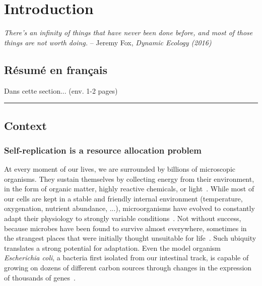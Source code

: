 \chapter{Introduction}

\textit{There's an infinity of things that have never been done before, and most of those things are not worth doing.} -- Jeremy Fox, \textit{Dynamic Ecology (2016)}~\cite{fox_how_2016}

\section*{Résumé en français}

Dans cette section... (env. 1-2 pages)

\begin{center}
\noindent\rule{4cm}{0.1pt}
\end{center}

\section{Context}
\label{sec:context}

\subsection{Self-replication is a resource allocation problem}

At every moment of our lives, we are surrounded by billions of microscopic organisms.
They sustain themselves by collecting energy from their environment, in the form of organic matter, highly reactive chemicals, or light~\cite{madigan_biology_2006,schaechter_microbe_2006}.
While most of our cells are kept in a stable and friendly internal environment (temperature, oxygenation, nutrient abundance, ...), microorganisms have evolved to constantly adapt their physiology to strongly variable conditions~\cite{mcarthur_microbial_2006,menge_nitrogen_2012,hobbie_microbes_2013,
savageau_escherichia_1983,savageau_demand_1998,blount_unexhausted_2015,vanelsas_survival_2011}.
Not without success, because microbes have been found to survive almost everywhere, sometimes in the strangest places that were initially thought unsuitable for life~\cite{rothschild_life_2001,nicholson_transcriptomic_2012,madigan_biology_2006,schaechter_microbe_2006}.
Such ubiquity translates a strong potential for adaptation.
Even the model organism \textit{Escherichia coli}, a bacteria first isolated from our intestinal track, is capable of growing on dozens of different carbon sources through changes in the expression of thousands of genes~\cite{zimmer_microcosm:_2009}.

